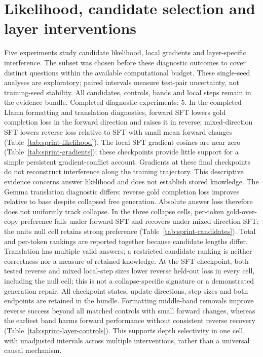 \section{Likelihood, candidate selection and layer interventions}
\label{app:mechanism-sprint}
Five experiments study candidate likelihood, local gradients and layer-specific interference. The subset was chosen before these diagnostic outcomes to cover distinct questions within the available computational budget. These single-seed analyses are exploratory; paired intervals measure test-pair uncertainty, not training-seed stability. All candidates, controls, bands and local steps remain in the evidence bundle.
Completed diagnostic experiments: 5.
In the completed Llama formatting and translation diagnostics, forward SFT lowers gold completion loss in the forward direction and raises it in reverse; mixed-direction SFT lowers reverse loss relative to SFT with small mean forward changes (Table~\ref{tab:sprint-likelihood}). The local SFT gradient cosines are near zero (Table~\ref{tab:sprint-gradients}); these checkpoints provide little support for a simple persistent gradient-conflict account. Gradients at these final checkpoints do not reconstruct interference along the training trajectory. This descriptive evidence concerns answer likelihood and does not establish stored knowledge.
The Gemma translation diagnostic differs: reverse gold completion loss improves relative to base despite collapsed free generation. Absolute answer loss therefore does not uniformly track collapse. In the three collapse cells, per-token gold-over-copy preference falls under forward SFT and recovers under mixed-direction SFT; the units null cell retains strong preference (Table~\ref{tab:sprint-candidates}). Total and per-token rankings are reported together because candidate lengths differ. Translation has multiple valid answers; a restricted candidate ranking is neither correctness nor a measure of retained knowledge. At the SFT checkpoint, both tested reverse and mixed local-step sizes lower reverse held-out loss in every cell, including the null cell; this is not a collapse-specific signature or a demonstrated generation repair. All checkpoint states, update directions, step sizes and both endpoints are retained in the bundle. Formatting middle-band removals improve reverse success beyond all matched controls with small forward changes, whereas the earliest band harms forward performance without consistent reverse recovery (Table~\ref{tab:sprint-layer-controls}). This supports depth selectivity in one cell, with unadjusted intervals across multiple interventions, rather than a universal causal mechanism.
